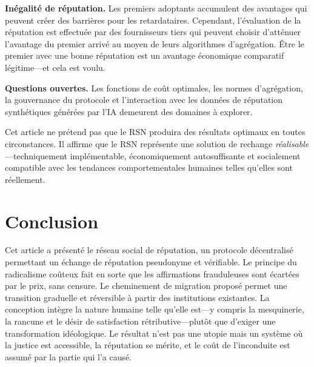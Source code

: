 \documentclass[11pt,a4paper,twocolumn]{article}
\begin{document}
\textbf{Inégalité de réputation.} Les premiers adoptants accumulent des avantages qui peuvent créer des barrières pour les retardataires. Cependant, l'évaluation de la réputation est effectuée par des fournisseurs tiers qui peuvent choisir d'atténuer l'avantage du premier arrivé au moyen de leurs algorithmes d'agrégation. Être le premier avec une bonne réputation est un avantage économique comparatif légitime---et cela est voulu.

\textbf{Questions ouvertes.} Les fonctions de coût optimales, les normes d'agrégation, la gouvernance du protocole et l'interaction avec les données de réputation synthétiques générées par l'IA demeurent des domaines à explorer.

Cet article ne prétend pas que le RSN produira des résultats optimaux en toutes circonstances. Il affirme que le RSN représente une solution de rechange \emph{réalisable}---techniquement implémentable, économiquement autosuffisante et socialement compatible avec les tendances comportementales humaines telles qu'elles sont réellement.

\section{Conclusion}

Cet article a présenté le réseau social de réputation, un protocole décentralisé permettant un échange de réputation pseudonyme et vérifiable. Le principe du radicalisme coûteux fait en sorte que les affirmations frauduleuses sont écartées par le prix, sans censure. Le cheminement de migration proposé permet une transition graduelle et réversible à partir des institutions existantes. La conception intègre la nature humaine telle qu'elle est---y compris la mesquinerie, la rancune et le désir de satisfaction rétributive---plutôt que d'exiger une transformation idéologique. Le résultat n'est pas une utopie mais un système où la justice est accessible, la réputation se mérite, et le coût de l'inconduite est assumé par la partie qui l'a causé.


\end{document}
